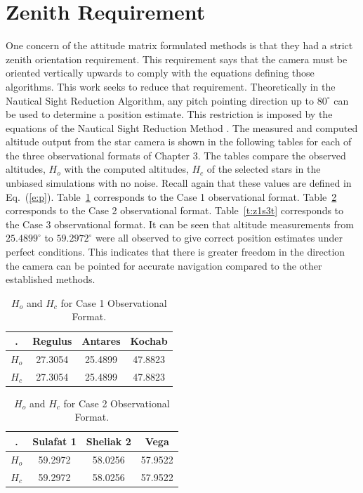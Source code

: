 \documentclass[12pt,a4paper]{book}
\begin{document}
\section{Zenith Requirement}
One concern of the attitude matrix formulated methods is that they had a strict zenith orientation requirement.  This requirement says that the camera must be oriented vertically upwards to comply with the equations defining those algorithms.  This work seeks to reduce that requirement.  Theoretically in the Nautical Sight Reduction Algorithm, any pitch pointing direction up to $80^{\circ}$ can be used to determine a position estimate.  This restriction is imposed by the equations of the Nautical Sight Reduction Method \cite{b:naut}.   The measured and computed altitude output from the star camera is shown in the following tables for each of the three observational formats of Chapter 3.  The tables compare the observed altitudes, $H_{o}$ with the computed altitudes, $H_{c}$ of the selected stars in the unbiased simulations with no noise. Recall again that these values are defined in Eq.~(\ref{e:p}).  Table~\ref{t:z3s3t} corresponds to the Case 1 observational format.   Table~\ref{t:z3s1t} corresponds to the Case 2 observational format.  Table~\ref{t:z1s3t} corresponds to the Case 3 observational format.  It can be seen that altitude measurements from $25.4899^{\circ}$ to $59.2972^{\circ}$ were all observed to give correct position estimates under perfect conditions.  This indicates that there is greater freedom in the direction the camera can be pointed for accurate navigation compared to the other established methods.  

\begin{table}[ht!]
\centering
\begin{tabular}{ |c|c|c|c| } 
 \hline
 . & Regulus & Antares & Kochab \\ 
 \hline
 $H_{o}$ & 27.3054 & 25.4899 & 47.8823 \\ 
 \hline
 $H_{c}$ & 27.3054  & 25.4899 & 47.8823 \\ 
 \hline
\end{tabular}
\caption{$H_{o}$ and $H_{c}$ for Case 1 Observational Format.}
\label{t:z3s3t}
\end{table}

\begin{table}[ht!]
\centering
\begin{tabular}{ |c|c|c|c| } 
 \hline
 . & Sulafat 1 & Sheliak 2 & Vega\\ 
 \hline
 $H_{o}$ & 59.2972 & 58.0256 & 57.9522 \\ 
 \hline
 $H_{c}$ & 59.2972 & 58.0256  & 57.9522 \\ 
 \hline
\end{tabular}
\caption{$H_{o}$ and $H_{c}$ for Case 2 Observational Format.}
\label{t:z3s1t}
\end{table}
\end{document}
